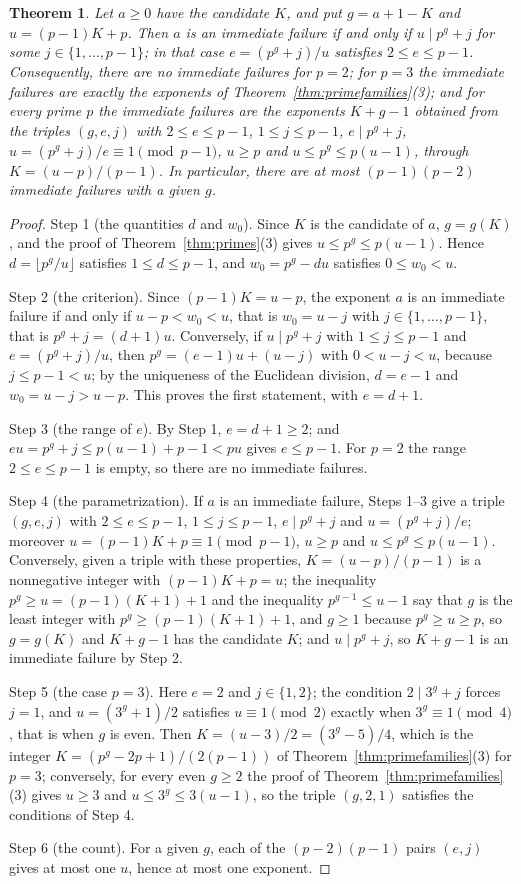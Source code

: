 \documentclass[11pt]{amsart}
\newtheorem{Theorem}{Theorem}[section]
\theoremstyle{definition}
\begin{document}
\begin{Theorem}
\label{thm:immediate}
Let $a\ge0$ have the candidate $K$, and put $g=a+1-K$ and $u=(p-1)K+p$. Then $a$ is an immediate failure if and only if $u\mid p^g+j$ for some $j\in\{1,\dots,p-1\}$; in that case $e=(p^g+j)/u$ satisfies $2\le e\le p-1$. Consequently, there are no immediate failures for $p=2$; for $p=3$ the immediate failures are exactly the exponents of Theorem~\ref{thm:primefamilies}(3); and for every prime $p$ the immediate failures are the exponents $K+g-1$ obtained from the triples $(g,e,j)$ with $2\le e\le p-1$, $1\le j\le p-1$, $e\mid p^g+j$, $u=(p^g+j)/e\equiv1\pmod{p-1}$, $u\ge p$ and $u\le p^g\le p(u-1)$, through $K=(u-p)/(p-1)$. In particular, there are at most $(p-1)(p-2)$ immediate failures with a given $g$.
\end{Theorem}
\begin{proof}
Step 1 (the quantities $d$ and $w_0$). Since $K$ is the candidate of $a$, $g=g(K)$, and the proof of Theorem~\ref{thm:primes}(3) gives $u\le p^g\le p(u-1)$. Hence $d=\lfloor p^g/u\rfloor$ satisfies $1\le d\le p-1$, and $w_0=p^g-du$ satisfies $0\le w_0<u$.

Step 2 (the criterion). Since $(p-1)K=u-p$, the exponent $a$ is an immediate failure if and only if $u-p<w_0<u$, that is $w_0=u-j$ with $j\in\{1,\dots,p-1\}$, that is $p^g+j=(d+1)u$. Conversely, if $u\mid p^g+j$ with $1\le j\le p-1$ and $e=(p^g+j)/u$, then $p^g=(e-1)u+(u-j)$ with $0<u-j<u$, because $j\le p-1<u$; by the uniqueness of the Euclidean division, $d=e-1$ and $w_0=u-j>u-p$. This proves the first statement, with $e=d+1$.

Step 3 (the range of $e$). By Step 1, $e=d+1\ge2$; and $eu=p^g+j\le p(u-1)+p-1<pu$ gives $e\le p-1$. For $p=2$ the range $2\le e\le p-1$ is empty, so there are no immediate failures.

Step 4 (the parametrization). If $a$ is an immediate failure, Steps 1--3 give a triple $(g,e,j)$ with $2\le e\le p-1$, $1\le j\le p-1$, $e\mid p^g+j$ and $u=(p^g+j)/e$; moreover $u=(p-1)K+p\equiv1\pmod{p-1}$, $u\ge p$ and $u\le p^g\le p(u-1)$. Conversely, given a triple with these properties, $K=(u-p)/(p-1)$ is a nonnegative integer with $(p-1)K+p=u$; the inequality $p^g\ge u=(p-1)(K+1)+1$ and the inequality $p^{g-1}\le u-1$ say that $g$ is the least integer with $p^g\ge(p-1)(K+1)+1$, and $g\ge1$ because $p^g\ge u\ge p$, so $g=g(K)$ and $K+g-1$ has the candidate $K$; and $u\mid p^g+j$, so $K+g-1$ is an immediate failure by Step 2.

Step 5 (the case $p=3$). Here $e=2$ and $j\in\{1,2\}$; the condition $2\mid3^g+j$ forces $j=1$, and $u=(3^g+1)/2$ satisfies $u\equiv1\pmod2$ exactly when $3^g\equiv1\pmod4$, that is when $g$ is even. Then $K=(u-3)/2=(3^g-5)/4$, which is the integer $K=(p^g-2p+1)/(2(p-1))$ of Theorem~\ref{thm:primefamilies}(3) for $p=3$; conversely, for every even $g\ge2$ the proof of Theorem~\ref{thm:primefamilies}(3) gives $u\ge3$ and $u\le3^g\le3(u-1)$, so the triple $(g,2,1)$ satisfies the conditions of Step 4.

Step 6 (the count). For a given $g$, each of the $(p-2)(p-1)$ pairs $(e,j)$ gives at most one $u$, hence at most one exponent.
\end{proof}
\end{document}
